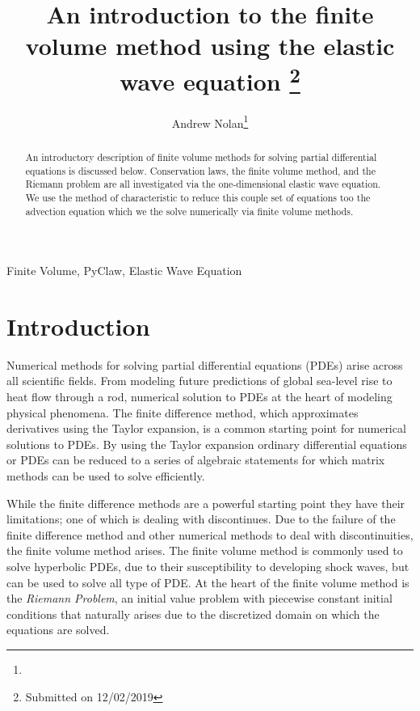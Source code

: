 \documentclass[review,onefignum,onetabnum]{siamart171218}
\title{An introduction to the finite volume method using the elastic wave equation 
\thanks{Submitted on 12/02/2019}}
\author{Andrew Nolan\thanks{\email{anolan@sfu.ca}}}
\begin{document}
\maketitle

\begin{abstract}
    An introductory description of finite volume methods for solving partial differential equations is discussed below. Conservation laws, the finite volume method, and the Riemann problem are all investigated via the one-dimensional elastic wave equation. We use the method of characteristic to reduce this couple set of equations too the advection equation which we the solve numerically via finite volume methods.
\end{abstract}

\begin{keywords}
  Finite Volume, PyClaw, Elastic Wave Equation
\end{keywords}


\section{Introduction} 
Numerical methods for solving partial differential equations (PDEs) arise across all scientific fields. From modeling future predictions of global sea-level rise to heat flow through a rod, numerical solution to PDEs at the heart of modeling physical phenomena. The finite difference method, which approximates derivatives using the Taylor expansion, is a common starting point for numerical solutions to PDEs. By using the Taylor expansion ordinary differential equations or PDEs can be reduced to a series of algebraic statements for which matrix methods can be used to solve efficiently.  

While the finite difference methods are a powerful starting point they have their limitations; one of which is dealing with discontinues. Due to the failure of the finite difference method and other numerical methods to deal with discontinuities, the finite volume method arises. The finite volume method is commonly used to solve hyperbolic PDEs, due to their susceptibility to developing shock waves, but can be used to solve all type of PDE. At the heart of the finite volume method is the \textit{Riemann Problem}, an initial value problem with piecewise constant initial conditions that naturally arises due to the discretized domain on which the equations are solved. 
\end{document}
